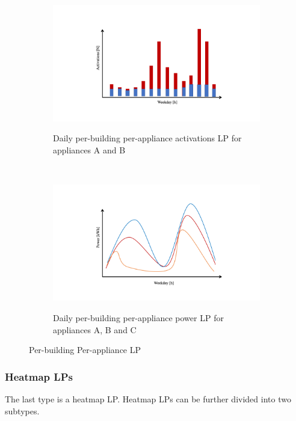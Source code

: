 \begin{figure}[H]
	\begin{subfigure}{.5\textwidth}
		\caption{Daily per-building per-appliance activations LP for appliances A and B}
		\includegraphics[width=1.1\textwidth]{Figures/profile_sketches/Slide8.png}
		\label{fig:daily_act_m_profile}
	\end{subfigure}%
	~ 
	\begin{subfigure}{.5\textwidth}
		\caption{Daily per-building per-appliance power LP for appliances A, B and C}
		\includegraphics[width=1.1\textwidth]{Figures/profile_sketches/Slide2.png}
		\label{fig:daily_power_m_profile}
	\end{subfigure}%
	\label{fig:daily_m_profile}
	\caption{Per-building Per-appliance LP}
\end{figure}

\subsubsection{Heatmap LPs}

The last type is a heatmap LP. 
Heatmap LPs can be further divided into two subtypes.

